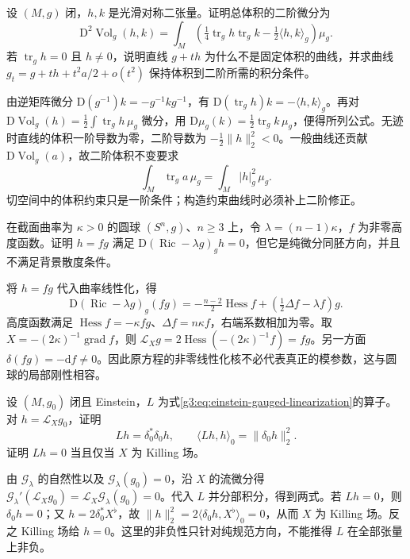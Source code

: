 \BookExercises

\begin{exercise}\label{g3:ex:einstein-volume-second-variation}
	设 \((M,g)\) 闭，\(h,k\) 是光滑对称二张量。证明总体积的二阶微分为
	\[
		\mathrm D^2\operatorname{Vol}_g(h,k)
		=\int_M\left(\tfrac14\operatorname{tr}_gh\operatorname{tr}_gk
		-\tfrac12\langle h,k\rangle_g\right)\mu_g.
	\]
	若 \(\operatorname{tr}_gh=0\) 且 \(h\ne0\)，说明直线 \(g+th\) 为什么不是固定体积的曲线，并求曲线 \(g_t=g+th+t^2a/2+o(t^2)\) 保持体积到二阶所需的积分条件。
\end{exercise}
\begin{solution}
	由逆矩阵微分 \(\mathrm D(g^{-1})k=-g^{-1}kg^{-1}\)，有 \(\mathrm D(\operatorname{tr}_gh)k=-\langle h,k\rangle_g\)。再对 \(\mathrm D\operatorname{Vol}_g(h)=\tfrac12\int\operatorname{tr}_gh\,\mu_g\) 微分，用 \(\mathrm D\mu_g(k)=\tfrac12\operatorname{tr}_gk\,\mu_g\)，便得所列公式。无迹时直线的体积一阶导数为零，二阶导数为 \(-\tfrac12\|h\|_2^2<0\)。一般曲线还贡献 \(\mathrm D\operatorname{Vol}_g(a)\)，故二阶体积不变要求
	\[
		\int_M\operatorname{tr}_ga\,\mu_g=\int_M|h|_g^2\,\mu_g.
	\]
	切空间中的体积约束只是一阶条件；构造约束曲线时必须补上二阶修正。
\end{solution}

\begin{exercise}\label{g3:ex:einstein-sphere-conformal-gauge}
	在截面曲率为 \(\kappa>0\) 的圆球 \((S^n,g)\)、\(n\ge3\) 上，令 \(\lambda=(n-1)\kappa\)，\(f\) 为非零高度函数。证明 \(h=fg\) 满足 \(\mathrm D(\operatorname{Ric}-\lambda g)_g h=0\)，但它是纯微分同胚方向，并且不满足背景散度条件。
\end{exercise}
\begin{solution}
	将 \(h=fg\) 代入曲率线性化，得
	\[
		\mathrm D(\operatorname{Ric}-\lambda g)_g(fg)
		=-\tfrac{n-2}{2}\operatorname{Hess}f
		+\left(\tfrac12\Delta f-\lambda f\right)g.
	\]
	高度函数满足 \(\operatorname{Hess}f=-\kappa fg\)、\(\Delta f=n\kappa f\)，右端系数相加为零。取 \(X=-(2\kappa)^{-1}\operatorname{grad}f\)，则 \(\mathcal L_Xg=2\operatorname{Hess}(-(2\kappa)^{-1}f)=fg\)。另一方面 \(\delta(fg)=-\mathrm df\ne0\)。因此原方程的非零线性化核不必代表真正的模参数，这与圆球的局部刚性相容。
\end{solution}

\begin{exercise}\label{g3:ex:einstein-pure-gauge-energy}
	设 \((M,g_0)\) 闭且 Einstein，\(L\) 为式\eqref{g3:eq:einstein-gauged-linearization}的算子。对 \(h=\mathcal L_Xg_0\)，证明
	\[
		Lh=\delta_0^*\delta_0h,\qquad
		\langle Lh,h\rangle_0=\|\delta_0h\|_2^2.
	\]
	证明 \(Lh=0\) 当且仅当 \(X\) 为 Killing 场。
\end{exercise}
\begin{solution}
	由 \(\mathcal G_\lambda\) 的自然性以及 \(\mathcal G_\lambda(g_0)=0\)，沿 \(X\) 的流微分得 \(\mathcal G_\lambda'(\mathcal L_Xg_0)=\mathcal L_X\mathcal G_\lambda(g_0)=0\)。代入 \(L\) 并分部积分，得到两式。若 \(Lh=0\)，则 \(\delta_0h=0\)；又 \(h=2\delta_0^*X^\flat\)，故 \(\|h\|_2^2=2\langle\delta_0h,X^\flat\rangle_0=0\)，从而 \(X\) 为 Killing 场。反之 Killing 场给 \(h=0\)。这里的非负性只针对纯规范方向，不能推得 \(L\) 在全部张量上非负。
\end{solution}

